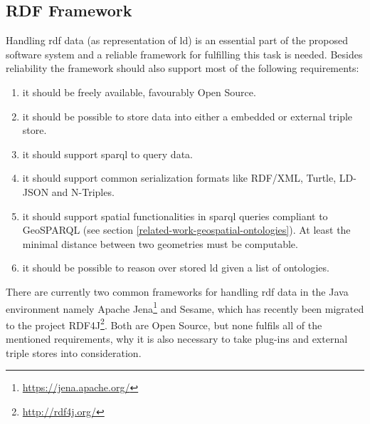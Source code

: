 \documentclass[draft,final]{vutinfth} %
\begin{document}
\subsection{RDF Framework}
\label{solution-architectural-prototype:rdf-framework}
Handling \gls{rdf} data (as representation of \gls{ld}) is an essential part of the proposed software system and a reliable framework for fulfilling this task is needed. Besides reliability the framework should also support most of the following requirements:

\begin{enumerate}
	\item it should be freely available, favourably Open Source.
	\item it should be possible to store data into either a embedded or external triple store.
	\item it should support \gls{sparql} to query data.
	\item it should support common serialization formats like RDF/XML, Turtle, LD-JSON and N-Triples.
	\item it should support spatial functionalities in \gls{sparql} queries compliant to GeoSPARQL (see section \ref{related-work-geospatial-ontologies}). At least the minimal distance between two geometries must be computable.
	\item it should be possible to reason over stored \gls{ld} given a list of ontologies. 
\end{enumerate}

There are currently two common frameworks for handling \gls{rdf} data in the Java environment namely Apache Jena\footnote{\url{https://jena.apache.org/}} and Sesame, which has recently been migrated to the project RDF4J\footnote{\url{http://rdf4j.org/}}. Both are Open Source, but none fulfils all of the mentioned requirements, why it is also necessary to take plug-ins and external triple stores into consideration.
\end{document}
